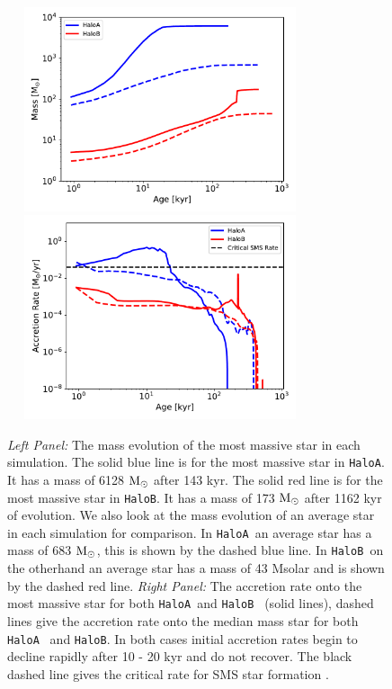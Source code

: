 \documentclass[graphics, twocolumn, usenatbib]{mn2e}
\newcommand{\msolar} {$\rm{M_{\odot}}~$}
\newcommand{\msolarc} {$\rm{M_{\odot}}$}
\newcommand{\ha} {\texttt{HaloA~}}
\newcommand{\hb} {\texttt{HaloB~}}
\newcommand{\hbc} {\texttt{HaloB}}
\begin{document}

\begin{figure}
\centering
\begin{minipage}{175mm}      \begin{center}
    \centerline{
      \includegraphics[width=9.0cm, height=6cm]{FIGURES/Mass_MultipleHaloes.pdf}
      \includegraphics[width=9.0cm, height=6cm]{FIGURES/MassAccretionRate_MultipleHaloes.pdf}}
    \caption{
      \textit{Left Panel:} The mass evolution of the most massive star in each simulation. The
      solid blue line is for the most massive star in \texttt{HaloA}. It has a mass of 6128 \msolar after 143 kyr.
      The solid red line is for the most massive star in \texttt{HaloB}. It has a mass of 173 \msolar after 1162 kyr
      of evolution. We also look at the mass evolution of an average star in each simulation for
      comparison. In \ha an average star has a mass of 683 \msolarc, this is shown by the dashed blue line.
      In \hb on the otherhand an average star has a mass of 43 Msolar and is shown by the dashed red line.
      \textit{Right Panel:} The accretion rate onto the most massive star for both \ha and \hb
      (solid lines), dashed lines give the accretion rate onto the median mass star for both \ha
      and \hbc. In both cases initial accretion rates begin to decline rapidly after 10 - 20 kyr and
      do not recover. The black dashed line gives the critical rate for SMS star formation
      \citep{Sakurai_2016}.
    }
\label{Fig:AccretionRates}
\end{center} \end{minipage}
\end{figure}
\end{document}
